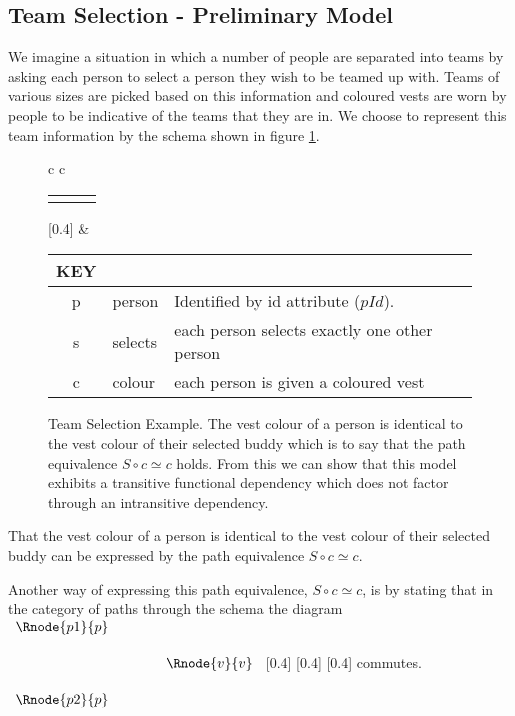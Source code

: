 \subsection{Team Selection - Preliminary Model}

We imagine a situation in which a number of people are separated into teams by asking each person to select a person they wish to be teamed up with. Teams of various sizes are picked based on this information and coloured vests are worn by people to be indicative of the teams that they are in.
We choose to represent this team information by the schema shown in figure \ref{teamselectionpreliminaryERschema}. 

\begin{figure} [h]
\begin{center}
\begin{tabular}{c c}
\begin{tabular}{c p{1.5cm} c}
   \Rnode{p}{p} & & \Rnode{v}{v}
\end{tabular}
[0.4]
\idcomp
& \footnotesize
\begin{tabular}{c p{1.5cm} p{4cm}}
KEY && \\
\hline
p & person & Identified by id attribute ($pId$). \\
s & selects & each person selects exactly one other person \\
c & colour & each person is given a coloured vest 
\end{tabular} 
\end{tabular}
\end{center}
\caption{Team Selection Example. The  vest colour  of a person is 
identical to the vest colour of their selected buddy which is to say that the path equivalence $S \circ c \simeq c$ holds. From this
we can show that this model exhibits a transitive functional dependency which does not factor through an intransitive dependency.
}
\label{teamselectionpreliminaryERschema}
\end{figure}

That the  vest colour  of a person is 
identical to the vest colour of their selected buddy can be expressed by the path equivalence $S \circ c \simeq c$. 
\begin{categoricalaside}
Another way of expressing this 
path equivalence, $S \circ c \simeq c$, is by stating that in the category of paths through the schema  the diagram
$
\begin{array}{c p{0.75cm} c}
   \Rnode{p1}{p}  & &                  \\[0.5cm]
	                 & &    \Rnode{v}{v} \\[0.5cm]
   \Rnode{p2}{p}  & &
			
\end{array}
$
[0.4]
[0.4]
[0.4]
commutes. 
\end{categoricalaside}

